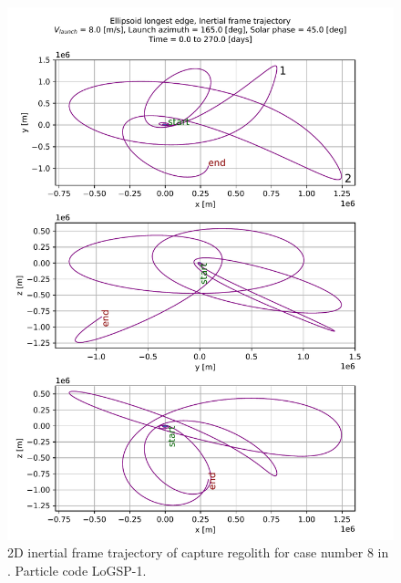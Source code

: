 \FloatBarrier
\begin{figure}[htb]
\centering
\captionsetup{justification=centering}
\includegraphics[width=\textwidth, height=\textheight]{longest_edge_perturbations/3.2Density_1cmSize/2dTrajectory_8ms_165Azimuth_45solarPhase_inertialFrame_edit.pdf}
\caption{2D inertial frame trajectory of capture regolith for case number 8 in . Particle code LoGSP-1.}
\label{fig:LoGSP_1_capture_case_8_2d_traj_inertialFrame}
\end{figure}
\FloatBarrier
